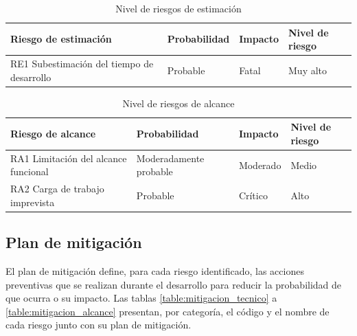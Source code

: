 \begin{table}[H]
	\centering
	\renewcommand{\arraystretch}{1.2}
	\setlength{\tabcolsep}{4pt}
	\begin{tabular}{|p{}|p{}|p{}|p{}|}
		\hline
		\textbf{Riesgo de estimación} & \textbf{Probabilidad} & \textbf{Impacto} & \textbf{Nivel de riesgo} \\ \hline
		RE1 Subestimación del tiempo de desarrollo & Probable & Fatal & Muy alto \\ \hline
	\end{tabular}
	\caption{Nivel de riesgos de estimación}
	\label{table:riesgos_estimacion}
\end{table}

\begin{table}[H]
	\centering
	\renewcommand{\arraystretch}{1.2}
	\setlength{\tabcolsep}{4pt}
	\begin{tabular}{|p{}|p{}|p{}|p{}|}
		\hline
		\textbf{Riesgo de alcance} & \textbf{Probabilidad} & \textbf{Impacto} & \textbf{Nivel de riesgo} \\ \hline 
		RA1 Limitación del alcance funcional & Modera\-da\-men\-te probable & Moderado & Medio \\ \hline
		RA2 Carga de trabajo imprevista & Probable & Crítico & Alto \\ \hline
	\end{tabular}
	\caption{Nivel de riesgos de alcance}
	\label{table:riesgos_alcance}
\end{table}

\subsection{Plan de mitigación}

El plan de mitigación define, para cada riesgo identificado, las acciones preventivas que se realizan durante el desarrollo para reducir la probabilidad de que ocurra o su impacto. Las tablas \ref{table:mitigacion_tecnico} a \ref{table:mitigacion_alcance} presentan, por categoría, el código y el nombre de cada riesgo junto con su plan de mitigación.

